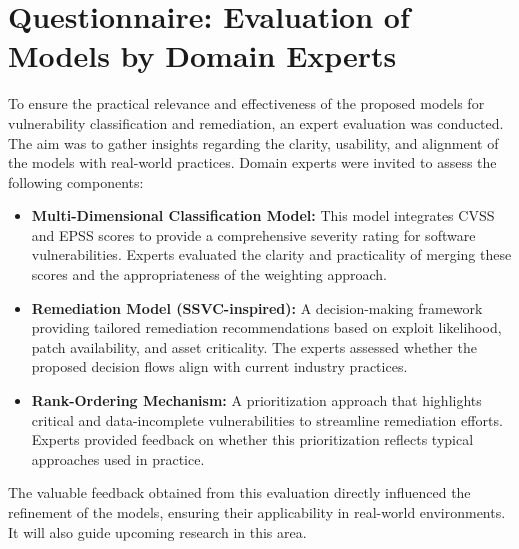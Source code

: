 \appendix
\section{Questionnaire: Evaluation of Models by Domain Experts}
\label{appendix:questionnaire}

To ensure the practical relevance and effectiveness of the proposed models for vulnerability classification and remediation, an expert evaluation was conducted. The aim was to gather insights regarding the clarity, usability, and alignment of the models with real-world practices. Domain experts were invited to assess the following components:

\begin{itemize}
    \item \textbf{Multi-Dimensional Classification Model:} 
    This model integrates \ac{CVSS} and \ac{EPSS} scores to provide a comprehensive severity rating for software vulnerabilities. Experts evaluated the clarity and practicality of merging these scores and the appropriateness of the weighting approach.

    \item \textbf{Remediation Model (\ac{SSVC}-inspired):}
    A decision-making framework providing tailored remediation recommendations based on exploit likelihood, patch availability, and asset criticality. The experts assessed whether the proposed decision flows align with current industry practices.

    \item \textbf{Rank-Ordering Mechanism:}
    A prioritization approach that highlights critical and data-incomplete vulnerabilities to streamline remediation efforts. Experts provided feedback on whether this prioritization reflects typical approaches used in practice.
\end{itemize}

The valuable feedback obtained from this evaluation directly influenced the refinement of the models, ensuring their applicability in real-world environments. It will also guide upcoming research in this area.


